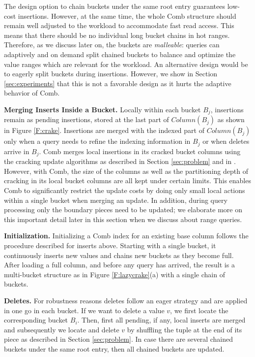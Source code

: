 \documentclass{sig-alternate}
\begin{document}
The design option to chain buckets under the same root entry guarantees low-cost insertions.
However, at the same time, the whole Comb structure should remain well adjusted to the workload to
accommodate fast read access.
This means that there should be no individual long bucket chains in hot ranges.
Therefore, as we discuss later on, the buckets are {\em malleable}:
queries can adaptively and on demand split chained buckets to balance
and optimize the value ranges which are relevant for the workload.
An alternative design would be to eagerly split buckets during insertions.
However, we show in Section \ref{sec:experiments} that this is not a favorable design as it
hurts the adaptive behavior of Comb.



\textbf{Merging Inserts Inside a Bucket.}
Locally within each bucket $B_j$, insertions remain as pending insertions, stored at the last part of $Column(B_j)$
as shown in Figure \ref{F:crake}.
Insertions are merged with the indexed part of $Column(B_j)$
only when a query needs to refine the indexing information in $B_j$ or when deletes arrive in $B_j$.
Comb merges local insertions in its cracked bucket columns using the cracking update algorithms
as described in Section \ref{sec:problem} and in \cite{IKM:SIGMOD07}.
However, with Comb, the size of the columns as well as the partitioning depth of cracking in its local bucket
columns are all kept under certain limits. This enables Comb to significantly restrict the update costs
by doing only small local actions within a single bucket when merging an update.
In addition, during query processing only the boundary pieces need to be updated;
we elaborate more on this important detail later in this section when we discuss about range queries.


\textbf{Initialization.}
Initializing a Comb index for an existing base column follows the procedure described for inserts above.
Starting with a single bucket, it continuously inserts new values and chains new buckets as they become full.
After loading a full column, and before any query has arrived,
the result is a multi-bucket structure as in Figure \ref{F:lazycrake}(a) with a single chain of buckets.



\textbf{Deletes.}
For robustness reasons deletes follow an eager strategy and are applied
in one go in each bucket. If we want to delete a value $v$, we first locate the
corresponding bucket $B_i$. Then, first all pending, if any, local inserts are merged
and subsequently we locate and delete $v$ by shuffling the tuple at the end of its
piece as described in Section \ref{sec:problem}.
In case there are several chained buckets under the same root entry,
then all chained buckets are updated.
\end{document}
